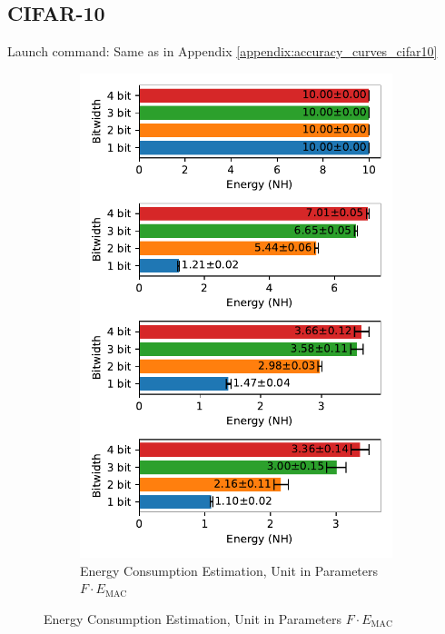     \subsection{CIFAR-10}
    \label{appendix:energy_neuromorphic_cifar10}
        Launch command: Same as in Appendix \ref{appendix:accuracy_curves_cifar10}

        \begin{figure}[H]
            \centering
            \begin{subfigure}[H]{0.495\textwidth}
                \includegraphics[width=\textwidth]{../standard/CIFAR10/plots/cifar10_test_energy_nh.pdf}
                \caption{Energy Consumption Estimation, Unit in Parameters $F\cdot E_{\text{MAC}}$}
            \end{subfigure}

\end{figure}
